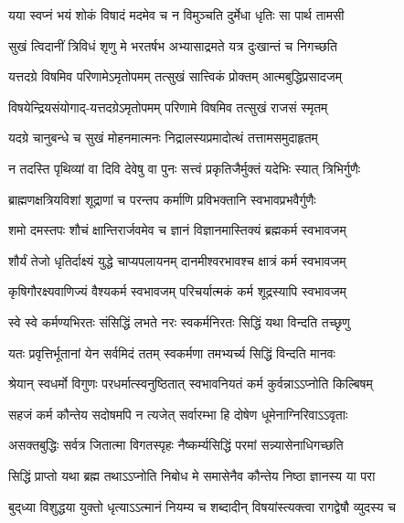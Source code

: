 \twolineshloka
{यया स्वप्नं भयं शोकं विषादं मदमेव च}
{न विमुञ्चति दुर्मेधा धृतिः सा पार्थ तामसी}%

\twolineshloka
{सुखं त्विदानीं त्रिविधं शृणु मे भरतर्षभ}
{अभ्यासाद्रमते यत्र दुःखान्तं च निगच्छति}%

\twolineshloka
{यत्तदग्रे विषमिव परिणामेऽमृतोपमम्}
{तत्सुखं सात्त्विकं प्रोक्तम् आत्मबुद्धिप्रसादजम्}%

\twolineshloka
{विषयेन्द्रियसंयोगाद्-यत्तदग्रेऽमृतोपमम्}
{परिणामे विषमिव तत्सुखं राजसं स्मृतम्}%

\twolineshloka
{यदग्रे चानुबन्धे च सुखं मोहनमात्मनः}
{निद्रालस्यप्रमादोत्थं तत्तामसमुदाहृतम्}%

\twolineshloka
{न तदस्ति पृथिव्यां वा दिवि देवेषु वा पुनः}
{सत्त्वं प्रकृतिजैर्मुक्तं यदेभिः स्यात् त्रिभिर्गुणैः}%

\twolineshloka
{ब्राह्मणक्षत्रियविशां शूद्राणां च परन्तप}
{कर्माणि प्रविभक्तानि स्वभावप्रभवैर्गुणैः}%

\twolineshloka
{शमो दमस्तपः शौचं क्षान्तिरार्जवमेव च}
{ज्ञानं विज्ञानमास्तिक्यं ब्रह्मकर्म स्वभावजम्}%

\twolineshloka
{शौर्यं तेजो धृतिर्दाक्ष्यं युद्धे चाप्यपलायनम्}
{दानमीश्वरभावश्च क्षात्रं कर्म स्वभावजम्}%

\twolineshloka
{कृषिगौरक्ष्यवाणिज्यं वैश्यकर्म स्वभावजम्}
{परिचर्यात्मकं कर्म शूद्रस्यापि स्वभावजम्}%

\twolineshloka
{स्वे स्वे कर्मण्यभिरतः संसिद्धिं लभते नरः}
{स्वकर्मनिरतः सिद्धिं यथा विन्दति तच्छृणु}%

\twolineshloka
{यतः प्रवृत्तिर्भूतानां येन सर्वमिदं ततम्}
{स्वकर्मणा तमभ्यर्च्य सिद्धिं विन्दति मानवः}%

\twolineshloka
{श्रेयान् स्वधर्मो विगुणः परधर्मात्स्वनुष्ठितात्}
{स्वभावनियतं कर्म कुर्वन्नाऽऽप्नोति किल्बिषम्}%

\twolineshloka
{सहजं कर्म कौन्तेय सदोषमपि न त्यजेत्}
{सर्वारम्भा हि दोषेण धूमेनाग्निरिवाऽऽवृताः}%

\twolineshloka
{असक्तबुद्धिः सर्वत्र जितात्मा विगतस्पृहः}
{नैष्कर्म्यसिद्धिं परमां सन्न्यासेनाधिगच्छति}%

\twolineshloka
{सिद्धिं प्राप्तो यथा ब्रह्म तथाऽऽप्नोति निबोध मे}
{समासेनैव कौन्तेय निष्ठा ज्ञानस्य या परा}%

\twolineshloka
{बुद्‌ध्या विशुद्धया युक्तो धृत्याऽऽत्मानं नियम्य च}
{शब्दादीन् विषयांस्त्यक्त्वा रागद्वेषौ व्युदस्य च}%

